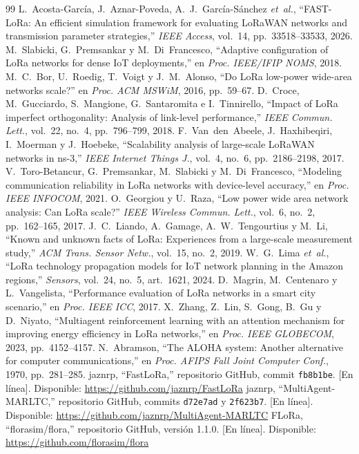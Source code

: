 \documentclass[conference,a4paper]{IEEEtran}
\begin{document}
\begin{thebibliography}{99}
 L.~Acosta-García, J.~Aznar-Poveda, A.~J.~García-Sánchez \emph{et~al.}, ``FAST-LoRa: An efficient simulation framework for evaluating LoRaWAN networks and transmission parameter strategies,'' \emph{IEEE Access}, vol.~14, pp.~33518--33533, 2026.
 M.~Slabicki, G.~Premsankar y M.~Di~Francesco, ``Adaptive configuration of LoRa networks for dense IoT deployments,'' en \emph{Proc. IEEE/IFIP NOMS}, 2018.
 M.~C.~Bor, U.~Roedig, T.~Voigt y J.~M.~Alonso, ``Do LoRa low-power wide-area networks scale?'' en \emph{Proc. ACM MSWiM}, 2016, pp.~59--67.
 D.~Croce, M.~Gucciardo, S.~Mangione, G.~Santaromita e I.~Tinnirello, ``Impact of LoRa imperfect orthogonality: Analysis of link-level performance,'' \emph{IEEE Commun. Lett.}, vol.~22, no.~4, pp.~796--799, 2018.
 F.~Van~den~Abeele, J.~Haxhibeqiri, I.~Moerman y J.~Hoebeke, ``Scalability analysis of large-scale LoRaWAN networks in ns-3,'' \emph{IEEE Internet Things J.}, vol.~4, no.~6, pp.~2186--2198, 2017.
 V.~Toro-Betancur, G.~Premsankar, M.~Slabicki y M.~Di~Francesco, ``Modeling communication reliability in LoRa networks with device-level accuracy,'' en \emph{Proc. IEEE INFOCOM}, 2021.
 O.~Georgiou y U.~Raza, ``Low power wide area network analysis: Can LoRa scale?'' \emph{IEEE Wireless Commun. Lett.}, vol.~6, no.~2, pp.~162--165, 2017.
 J.~C.~Liando, A.~Gamage, A.~W.~Tengourtius y M.~Li, ``Known and unknown facts of LoRa: Experiences from a large-scale measurement study,'' \emph{ACM Trans. Sensor Netw.}, vol.~15, no.~2, 2019.
 W.~G.~Lima \emph{et~al.}, ``LoRa technology propagation models for IoT network planning in the Amazon regions,'' \emph{Sensors}, vol.~24, no.~5, art.~1621, 2024.
 D.~Magrin, M.~Centenaro y L.~Vangelista, ``Performance evaluation of LoRa networks in a smart city scenario,'' en \emph{Proc. IEEE ICC}, 2017.
 X.~Zhang, Z.~Lin, S.~Gong, B.~Gu y D.~Niyato, ``Multiagent reinforcement learning with an attention mechanism for improving energy efficiency in LoRa networks,'' en \emph{Proc. IEEE GLOBECOM}, 2023, pp.~4152--4157.
 N.~Abramson, ``The ALOHA system: Another alternative for computer communications,'' en \emph{Proc. AFIPS Fall Joint Computer Conf.}, 1970, pp.~281--285.
 jaznrp, ``FastLoRa,'' repositorio GitHub, commit \texttt{fb8b1be}. [En línea]. Disponible: \url{https://github.com/jaznrp/FastLoRa}
 jaznrp, ``MultiAgent-MARLTC,'' repositorio GitHub, commits \texttt{d72e7ad} y \texttt{2f623b7}. [En línea]. Disponible: \url{https://github.com/jaznrp/MultiAgent-MARLTC}
 FLoRa, ``florasim/flora,'' repositorio GitHub, versión 1.1.0. [En línea]. Disponible: \url{https://github.com/florasim/flora}
\end{thebibliography}
\end{document}
